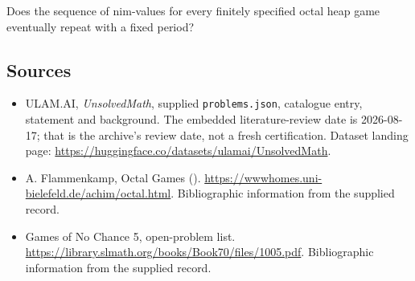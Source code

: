 \documentclass[11pt,a4paper]{article}
\begin{document}
Does the sequence of nim-values for every finitely specified octal heap game eventually repeat with a fixed period?

\subsection{Sources}

{\small

\begin{itemize}

\item[\hypertarget{source:statement:1}{S1}] ULAM.AI, \emph{UnsolvedMath}, supplied \texttt{problems.json}, catalogue entry, statement and background. The embedded literature-review date is 2026-08-17; that is the archive’s review date, not a fresh certification. Dataset landing page: \url{https://huggingface.co/datasets/ulamai/UnsolvedMath}.

\item[\hypertarget{source:statement:2}{S2}] A. Flammenkamp, Octal Games (). \url{https://wwwhomes.uni-bielefeld.de/achim/octal.html}. Bibliographic information from the supplied record.

\item[\hypertarget{source:statement:3}{S3}] Games of No Chance 5, open-problem list. \url{https://library.slmath.org/books/Book70/files/1005.pdf}. Bibliographic information from the supplied record.

\end{itemize}

}

\label{end:statement}
\end{document}
